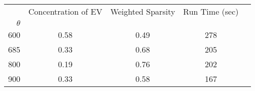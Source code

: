 \begin{tabular}{r|cccc}
\toprule
{} &  Concentration of EV &  Weighted Sparsity & Run Time (sec) \\
$\theta$ &                      &           &                \\
\midrule
600      &                 0.58 &      0.49 &            278 \\
685      &                 0.33 &      0.68 &            205 \\
800      &                 0.19 &      0.76 &            202 \\
900      &                 0.33 &      0.58 &            167 \\
\bottomrule
\end{tabular}
